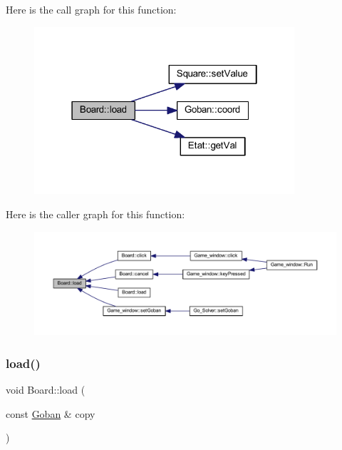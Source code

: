 Here is the call graph for this function\+:
\nopagebreak
\begin{figure}[H]
\begin{center}
\leavevmode
\includegraphics[width=274pt]{class_board_a841a248dac4743611ba1825afd5d1297_cgraph}
\end{center}
\end{figure}
Here is the caller graph for this function\+:
\nopagebreak
\begin{figure}[H]
\begin{center}
\leavevmode
\includegraphics[width=350pt]{class_board_a841a248dac4743611ba1825afd5d1297_icgraph}
\end{center}
\end{figure}
\mbox{\label{class_board_a3cea4df16e41c21666cf51789b7e9e78}} 
\subsubsection{\texorpdfstring{load()}{load()}\hspace{0.1cm}{\footnotesize\ttfamily [2/2]}}
{\footnotesize\ttfamily void Board\+::load (\begin{DoxyParamCaption}\item[{const \hyperlink{class_goban}{Goban} \&}]{copy }\end{DoxyParamCaption})}

